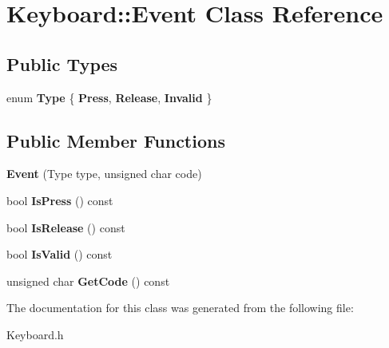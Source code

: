 \hypertarget{class_keyboard_1_1_event}{}\section{Keyboard\+:\+:Event Class Reference}
\label{class_keyboard_1_1_event}
\subsection*{Public Types}
\begin{DoxyCompactItemize}
\item 
\mbox{\label{class_keyboard_1_1_event_aaa12f942b71b42761c3bec96f3a67075}} 
enum {\bfseries Type} \{ {\bfseries Press}, 
{\bfseries Release}, 
{\bfseries Invalid}
 \}
\end{DoxyCompactItemize}
\subsection*{Public Member Functions}
\begin{DoxyCompactItemize}
\item 
\mbox{\label{class_keyboard_1_1_event_abf5090b40bbd93c32878521ae61de3b7}} 
{\bfseries Event} (Type type, unsigned char code)
\item 
\mbox{\label{class_keyboard_1_1_event_ae789b12e35794b03858e0decd61dda71}} 
bool {\bfseries Is\+Press} () const
\item 
\mbox{\label{class_keyboard_1_1_event_a23b254195a1305b536efecea4c5ecb4b}} 
bool {\bfseries Is\+Release} () const
\item 
\mbox{\label{class_keyboard_1_1_event_a5b7cea14f9a1f56e630d538ab4cbc1b7}} 
bool {\bfseries Is\+Valid} () const
\item 
\mbox{\label{class_keyboard_1_1_event_a00b59fcaaf7537e511a7d9eaa88b78c4}} 
unsigned char {\bfseries Get\+Code} () const
\end{DoxyCompactItemize}


The documentation for this class was generated from the following file\+:\begin{DoxyCompactItemize}
\item 
Keyboard.\+h\end{DoxyCompactItemize}
